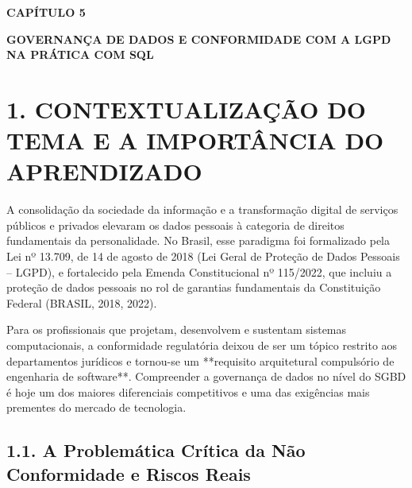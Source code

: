 
\begin{center}
\textbf{\fontsize{14}{16}\selectfont CAPÍTULO 5}

\vspace{0.5em}

\textbf{\fontsize{14}{16}\selectfont GOVERNANÇA DE DADOS E CONFORMIDADE COM A LGPD NA PRÁTICA COM SQL}
\end{center}

\vspace{1.5em}

\section*{1. CONTEXTUALIZAÇÃO DO TEMA E A IMPORTÂNCIA DO APRENDIZADO}

A consolidação da sociedade da informação e a transformação digital de serviços públicos e privados elevaram os dados pessoais à categoria de direitos fundamentais da personalidade. No Brasil, esse paradigma foi formalizado pela Lei nº 13.709, de 14 de agosto de 2018 (Lei Geral de Proteção de Dados Pessoais -- LGPD), e fortalecido pela Emenda Constitucional nº 115/2022, que incluiu a proteção de dados pessoais no rol de garantias fundamentais da Constituição Federal (BRASIL, 2018, 2022).

Para os profissionais que projetam, desenvolvem e sustentam sistemas computacionais, a conformidade regulatória deixou de ser um tópico restrito aos departamentos jurídicos e tornou-se um **requisito arquitetural compulsório de engenharia de software**. Compreender a governança de dados no nível do SGBD é hoje um dos maiores diferenciais competitivos e uma das exigências mais prementes do mercado de tecnologia.

\subsection*{1.1. A Problemática Crítica da Não Conformidade e Riscos Reais}

